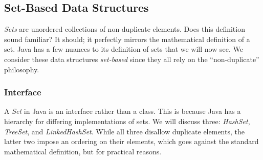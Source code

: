 \subsection*{Set-Based Data Structures}
\textit{Sets} are unordered collections of non-duplicate elements. Does this definition sound familiar? It should; it perfectly mirrors the mathematical definition of a set. Java has a few nuances to its definition of sets that we will now see. We consider these data structures \textit{set-based} since they all rely on the ``non-duplicate'' philosophy.

\subsubsection*{ Interface}
A \textit{Set} in Java is an interface rather than a class. This is because Java has a hierarchy for differing implementations of sets. We will discuss three: \textit{HashSet}, \textit{TreeSet}, and \textit{LinkedHashSet}. While all three disallow duplicate elements, the latter two impose an ordering on their elements, which goes against the standard mathematical definition, but for practical reasons.

